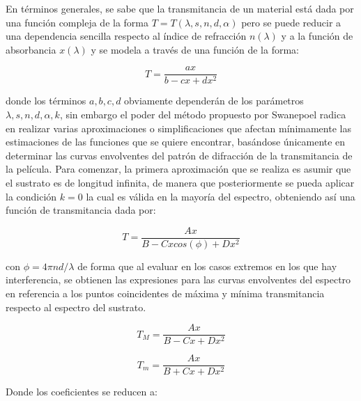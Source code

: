 \documentclass[article]{article}
\begin{document}
\begin{multicols}{2}
    En términos generales, se sabe que la transmitancia de un material está dada por una función compleja de la forma $T=T(\lambda,s, n, d, \alpha)$ pero se puede reducir a una dependencia sencilla respecto al índice de refracción $n(\lambda)$ y a la función de absorbancia $x(\lambda)$ y se modela a través de una función de la forma:
    
    \begin{equation*}
        T=\frac{ax}{b-cx+dx^2}
    \end{equation*}
    
    donde los términos $a,b,c,d$ obviamente dependerán de los parámetros $\lambda,s, n, d, \alpha, k$, sin embargo el poder del método propuesto por Swanepoel radica en realizar varias aproximaciones o simplificaciones que afectan mínimamente las estimaciones de las funciones que se quiere encontrar, basándose únicamente en determinar las curvas envolventes del patrón de difracción de la transmitancia de la película. Para comenzar, la primera aproximación que se realiza es asumir que el sustrato es de longitud infinita, de manera que posteriormente se pueda aplicar la condición $k=0$ la cual es válida en la mayoría del espectro, obteniendo así una función de transmitancia dada por:
    
    \begin{equation}
        T=\frac{Ax}{B-Cxcos(\phi)+Dx^2}
        \label{Eq: Curva transmitancia teorica}
    \end{equation}
    
    con $\phi=4\pi nd/ \lambda$ de forma que al evaluar en los casos extremos en los que hay interferencia, se obtienen las expresiones para las curvas envolventes del espectro en referencia a los puntos coincidentes de máxima y mínima transmitancia respecto al espectro del sustrato.
    
    \begin{equation}
        T_M = \frac{Ax}{B-Cx+Dx^2}
        \label{Eq: Envolvente maxima}
    \end{equation}
    
    \begin{equation}
        T_m = \frac{Ax}{B+Cx+Dx^2}
        \label{Eq: Envolvente mínima}
    \end{equation}
    
    Donde los coeficientes se reducen a:
    

\end{multicols}
\end{document}
